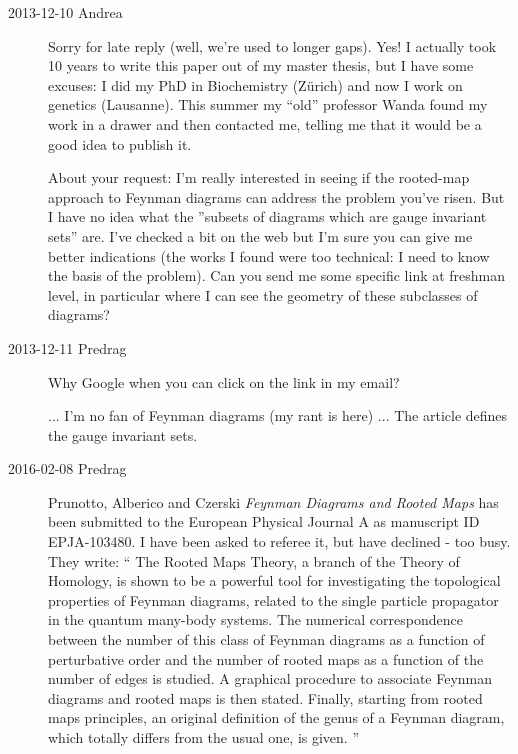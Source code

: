 \begin{description}
\item[2013-12-10   {Andrea}]
Sorry for late reply (well, we're used to longer gaps). Yes! I actually
took 10 years to write this paper out of my master thesis, but I have
some excuses: I did my PhD in Biochemistry (Z\"urich) and now I work on
genetics (Lausanne). This summer my ``old'' professor Wanda found my work
in a drawer and then contacted me, telling me that it would be a good
idea to publish it.

About your request: I'm really interested in seeing if the rooted-map
approach to Feynman diagrams can address the problem you've risen. But I
have no idea what the ''subsets of diagrams which are gauge invariant
sets'' are. I've checked a bit on the web but I'm sure you can give me
better indications (the works I found were too technical: I need to know
the basis of the problem). Can you send me some specific link at freshman
level, in particular where I can see the geometry of these subclasses of
diagrams?

\item[2013-12-11  Predrag]
Why Google when you can click on the link in my email?

    ... I'm no fan of Feynman diagrams (my rant is
{here}) ... The article defines the gauge invariant sets.

\item[2016-02-08  Predrag]
Prunotto, Alberico and Czerski
{\em Feynman Diagrams and Rooted Maps}
has been submitted to the European Physical Journal A as manuscript ID EPJA-103480.
I have been asked to referee it, but have declined - too busy. They write: ``
The  Rooted Maps Theory, a branch of the Theory of Homology, is shown to be
a powerful tool for investigating  the topological properties of Feynman
diagrams, related to the single particle propagator in the quantum many-body
systems. The numerical correspondence between the number of this class of
Feynman diagrams as a function of perturbative order and the number of rooted
maps as a function of the number of edges is studied. A graphical procedure to
associate Feynman diagrams and rooted maps is then stated. Finally, starting
from rooted maps principles, an original definition of the genus of a
Feynman diagram, which totally differs from the usual one, is given.
''

\end{description}



